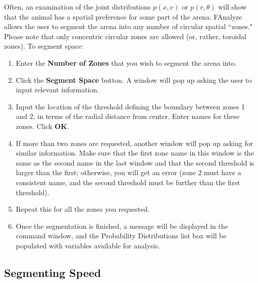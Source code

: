 \documentclass[letterpaper, 11pt]{article}
\begin{document}
Often, an examination of the joint distributions $p(x,v)$ or $p(r,\theta)$ will show that the
animal has a spatial preference for some part of the arena.  FAnalyze allows the user to segment
the arena into any number of circular spatial ``zones."  Please note that only concentric circular
zones are allowed (or, rather, toroidal zones).  To segment space:
\begin{enumerate}
\item Enter the \textbf{Number of Zones} that you wish to segment the arena into.
\item Click the \textbf{Segment Space} button.  A window will pop up asking the user to input
relevant information.
\item Input the location of the threshold defining the boundary between zones 1 and 2, in terms of the radial distance from center.  Enter names for these zones. Click \textbf{OK}.
\item If more than two zones are requested, another window will pop up asking for similar
information.  Make sure that the first zone name in this window is the same as the second name in
the last window and that the second threshold is larger than the first; otherwise, you will get an
error (zone 2 must have a consistent name, and the second threshold must be further than the first
threshold).
\item Repeat this for all the zones you requested.
\item Once the segmentation is finished, a message will be displayed in the command window, and the
Probability Distributions list box will be populated with variables available for analysis.
\end{enumerate}

\subsection*{Segmenting Speed}
\end{document}
